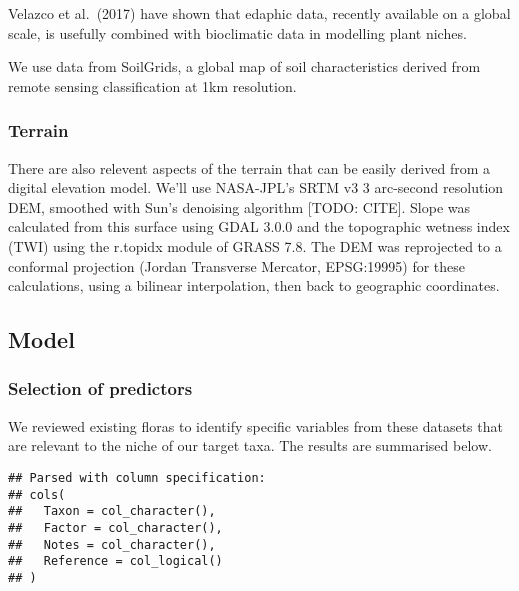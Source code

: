 \documentclass[]{article}
\begin{document}
Velazco et al.~(2017) have shown that edaphic data, recently available
on a global scale, is usefully combined with bioclimatic data in
modelling plant niches.

We use data from SoilGrids, a global map of soil characteristics derived
from remote sensing classification at 1km resolution.

\hypertarget{terrain}{%
\subsubsection{Terrain}\label{terrain}}

There are also relevent aspects of the terrain that can be easily
derived from a digital elevation model. We'll use NASA-JPL's SRTM v3 3
arc-second resolution DEM, smoothed with Sun's denoising algorithm
{[}TODO: CITE{]}. Slope was calculated from this surface using GDAL
3.0.0 and the topographic wetness index (TWI) using the r.topidx module
of GRASS 7.8. The DEM was reprojected to a conformal projection (Jordan
Transverse Mercator, EPSG:19995) for these calculations, using a
bilinear interpolation, then back to geographic coordinates.

\hypertarget{model}{%
\subsection{Model}\label{model}}

\hypertarget{selection-of-predictors}{%
\subsubsection{Selection of predictors}\label{selection-of-predictors}}

We reviewed existing floras to identify specific variables from these
datasets that are relevant to the niche of our target taxa. The results
are summarised below.

\begin{verbatim}
## Parsed with column specification:
## cols(
##   Taxon = col_character(),
##   Factor = col_character(),
##   Notes = col_character(),
##   Reference = col_logical()
## )
\end{verbatim}
\end{document}
